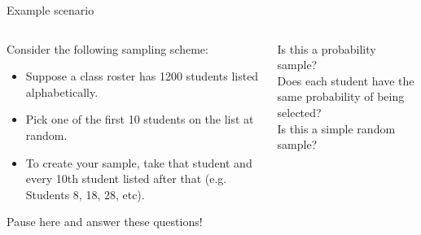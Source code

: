 \documentclass[aspectratio=169]{../latex_main/tntbeamer}  %
\begin{document}
	
	
		\begin{frame}{Example scenario}
	    \begin{columns}
	        \begin{column}{.3\textwidth}
	            Consider the following sampling scheme:

	            \begin{itemize}
	                \item Suppose a class roster has 1200 students listed alphabetically.
	                \item Pick one of the first 10 students on the list at random.
	                \item To create your sample, take that student and every 10th student listed after that (e.g. Students 8, 18, 28, etc).
	            \end{itemize}
	            Pause here and answer these questions!
                 
	        \end{column}
	        
	        \begin{column}{.6\textwidth}
	           Is this a probability sample?\\
	           \bigskip
	           Does each student have the same probability of being selected?\\
	           \bigskip
	           Is this a simple random sample?


	        \end{column}
	        
	    \end{columns}
	    
	\end{frame}
	
\end{document}
